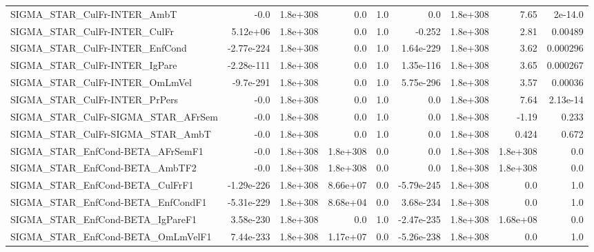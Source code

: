 \begin{tabular}{lrrrrrrrr}
SIGMA\_STAR\_CulFr-INTER\_AmbT           &        -0.0 &     1.8e+308 &        0.0 &      1.0 &        0.0 &    1.8e+308 &         7.65 &       2e-14.0 \\
SIGMA\_STAR\_CulFr-INTER\_CulFr          &    5.12e+06 &     1.8e+308 &        0.0 &      1.0 &     -0.252 &    1.8e+308 &         2.81 &       0.00489 \\
SIGMA\_STAR\_CulFr-INTER\_EnfCond        &  -2.77e-224 &     1.8e+308 &        0.0 &      1.0 &  1.64e-229 &    1.8e+308 &         3.62 &      0.000296 \\
SIGMA\_STAR\_CulFr-INTER\_IgPare         &  -2.28e-111 &     1.8e+308 &        0.0 &      1.0 &  1.35e-116 &    1.8e+308 &         3.65 &      0.000267 \\
SIGMA\_STAR\_CulFr-INTER\_OmLmVel        &   -9.7e-291 &     1.8e+308 &        0.0 &      1.0 &  5.75e-296 &    1.8e+308 &         3.57 &       0.00036 \\
SIGMA\_STAR\_CulFr-INTER\_PrPers         &        -0.0 &     1.8e+308 &        0.0 &      1.0 &        0.0 &    1.8e+308 &         7.64 &      2.13e-14 \\
SIGMA\_STAR\_CulFr-SIGMA\_STAR\_AFrSem    &        -0.0 &     1.8e+308 &        0.0 &      1.0 &        0.0 &    1.8e+308 &        -1.19 &         0.233 \\
SIGMA\_STAR\_CulFr-SIGMA\_STAR\_AmbT      &        -0.0 &     1.8e+308 &        0.0 &      1.0 &        0.0 &    1.8e+308 &        0.424 &         0.672 \\
SIGMA\_STAR\_EnfCond-BETA\_AFrSemF1      &        -0.0 &     1.8e+308 &   1.8e+308 &      0.0 &        0.0 &    1.8e+308 &     1.8e+308 &           0.0 \\
SIGMA\_STAR\_EnfCond-BETA\_AmbTF2        &        -0.0 &     1.8e+308 &   1.8e+308 &      0.0 &        0.0 &    1.8e+308 &     1.8e+308 &           0.0 \\
SIGMA\_STAR\_EnfCond-BETA\_CulFrF1       &  -1.29e-226 &     1.8e+308 &   8.66e+07 &      0.0 & -5.79e-245 &    1.8e+308 &          0.0 &           1.0 \\
SIGMA\_STAR\_EnfCond-BETA\_EnfCondF1     &  -5.31e-229 &     1.8e+308 &   8.68e+04 &      0.0 &  3.68e-234 &    1.8e+308 &          0.0 &           1.0 \\
SIGMA\_STAR\_EnfCond-BETA\_IgPareF1      &   3.58e-230 &     1.8e+308 &        0.0 &      1.0 & -2.47e-235 &    1.8e+308 &     1.68e+08 &           0.0 \\
SIGMA\_STAR\_EnfCond-BETA\_OmLmVelF1     &   7.44e-233 &     1.8e+308 &   1.17e+07 &      0.0 & -5.26e-238 &    1.8e+308 &          0.0 &           1.0 \\

\end{tabular}
